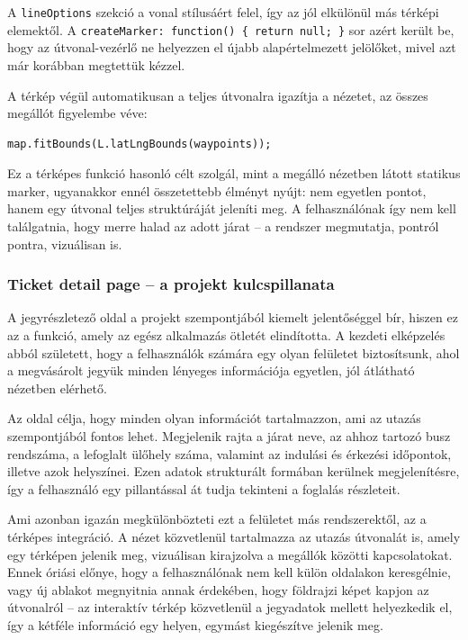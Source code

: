 A \texttt{lineOptions} szekció a vonal stílusáért felel, így az jól elkülönül más térképi elemektől. A \texttt{createMarker: function() \{ return null; \}} sor azért került be, hogy az útvonal-vezérlő ne helyezzen el újabb alapértelmezett jelölőket, mivel azt már korábban megtettük kézzel.

A térkép végül automatikusan a teljes útvonalra igazítja a nézetet, az összes megállót figyelembe véve:

\begin{lstlisting}
map.fitBounds(L.latLngBounds(waypoints));
\end{lstlisting}

Ez a térképes funkció hasonló célt szolgál, mint a megálló nézetben látott statikus marker, ugyanakkor ennél összetettebb élményt nyújt: nem egyetlen pontot, hanem egy útvonal teljes struktúráját jeleníti meg. A felhasználónak így nem kell találgatnia, hogy merre halad az adott járat – a rendszer megmutatja, pontról pontra, vizuálisan is.


\subsubsection{Ticket detail page – a projekt kulcspillanata}

A jegyrészletező oldal a projekt szempontjából kiemelt jelentőséggel bír, hiszen ez az a funkció, amely az egész alkalmazás ötletét elindította. A kezdeti elképzelés abból született, hogy a felhasználók számára egy olyan felületet biztosítsunk, ahol a megvásárolt jegyük minden lényeges információja egyetlen, jól átlátható nézetben elérhető.

Az oldal célja, hogy minden olyan információt tartalmazzon, ami az utazás szempontjából fontos lehet. Megjelenik rajta a járat neve, az ahhoz tartozó busz rendszáma, a lefoglalt ülőhely száma, valamint az indulási és érkezési időpontok, illetve azok helyszínei. Ezen adatok strukturált formában kerülnek megjelenítésre, így a felhasználó egy pillantással át tudja tekinteni a foglalás részleteit.

Ami azonban igazán megkülönbözteti ezt a felületet más rendszerektől, az a térképes integráció. A nézet közvetlenül tartalmazza az utazás útvonalát is, amely egy térképen jelenik meg, vizuálisan kirajzolva a megállók közötti kapcsolatokat. Ennek óriási előnye, hogy a felhasználónak nem kell külön oldalakon keresgélnie, vagy új ablakot megnyitnia annak érdekében, hogy földrajzi képet kapjon az útvonalról – az interaktív térkép közvetlenül a jegyadatok mellett helyezkedik el, így a kétféle információ egy helyen, egymást kiegészítve jelenik meg.

